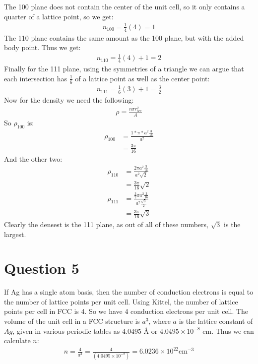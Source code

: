 \documentclass[12pt]{article}
\begin{document}
The 100 plane does not contain the center of the unit cell, so it only contains a quarter of a lattice point, so we get:
\begin{align*}
  n_{100}=\frac{1}{4}(4)=1
\end{align*}
The 110 plane contains the same amount as the 100 plane, but with the added body point. Thus we get:
\begin{align*}
  n_{110}=\frac{1}{4}(4)+1=2
\end{align*}
Finally for the 111 plane, using the symmetries of a triangle we can argue that each intersection has $\frac{1}{6}$ of a lattice point as well as the center point:
\begin{align*}
  n_{111}=\frac{1}{6}(3)+1=\frac{3}{2}
\end{align*}
Now for the density we need  the following:
\begin{align*}
  \rho=\frac{n\pi r_{bcc}^2}{A}
\end{align*}
So $\rho_{100}$ is:
\begin{align*}
  \rho_{100}&=\frac{1*\pi*a^2\frac{3}{16}}{a^2}\\
  &=\frac{3\pi}{16}
\end{align*}
And the other two:
\begin{align*}
  \rho_{110}&=\frac{2\pi a^2\frac{3}{16}}{a^2\sqrt{2}}\\
            &=\frac{3\pi}{16}\sqrt{2}\\
  \rho_{111}&=\frac{\frac{3}{2}\pi a^2\frac{3}{16}}{a^2\frac{\sqrt{3}}{2}}\\
            &=\frac{3\pi}{16}\sqrt{3}
\end{align*}
Clearly the densest is the 111 plane, as out of all of these numbers, $\sqrt{3}$ is the largest. 
\section*{Question 5}
If Ag has a single atom basis, then the number of conduction electrons is equal to the number of lattice points per unit cell. Using Kittel, the number of lattice points per cell in FCC is 4. So we have 4 conduction electrons per unit cell. The volume of the unit cell in a FCC structure is $a^3$, where $a$ is the lattice constant of $Ag$, given in various periodic tables as $4.0495$ \r{A} or $4.0495\times10^{-8}$ cm. Thus we can calculate $n$:
\begin{align*}
  n=\frac{4}{a^3}=\frac{4}{(4.0495\times10^{-8})}=
  \boxed{6.0236\times10^{22}\text{cm}^{-3}}
\end{align*}
\end{document}
